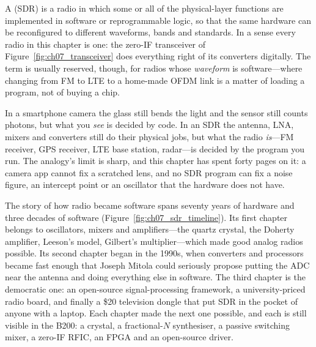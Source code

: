 A  (SDR) is a radio in which some or all of the physical-layer functions
are implemented in software or reprogrammable logic, so that the same hardware can be reconfigured to
different waveforms, bands and standards. In a sense every radio in this chapter is one: the zero-IF
transceiver of Figure~\ref{fig:ch07_transceiver} does everything right of its converters digitally. The
term is usually reserved, though, for radios whose \emph{waveform} is software---where changing from FM
to LTE to a home-made OFDM link is a matter of loading a program, not of buying a chip.

\begin{analogy}
In a smartphone camera the glass still bends the light and the sensor still counts photons, but what
you \emph{see} is decided by code. In an SDR the antenna, LNA, mixers and converters still do their
physical jobs, but what the radio \emph{is}---FM receiver, GPS receiver, LTE base station, radar---is
decided by the program you run. The analogy's limit is sharp, and this chapter has spent forty pages on
it: a camera app cannot fix a scratched lens, and no SDR program can fix a noise figure, an intercept
point or an oscillator that the hardware does not have.
\end{analogy}


The story of how radio became software spans seventy years of hardware and three decades of software
(Figure~\ref{fig:ch07_sdr_timeline}). Its first chapter belongs to oscillators, mixers and amplifiers---the
quartz crystal, the Doherty amplifier, Leeson's model, Gilbert's multiplier---which made good analog
radios possible. Its second chapter began in the 1990s, when converters and processors became fast
enough that Joseph Mitola could seriously propose putting the ADC near the antenna and doing everything
else in software. The third chapter is the democratic one: an open-source signal-processing framework,
a university-priced radio board, and finally a \$20 television dongle that put SDR in the pocket of
anyone with a laptop. Each chapter made the next one possible, and each is still visible in the B200:
a crystal, a fractional-$N$ synthesiser, a passive switching mixer, a zero-IF RFIC, an FPGA and an
open-source driver.

